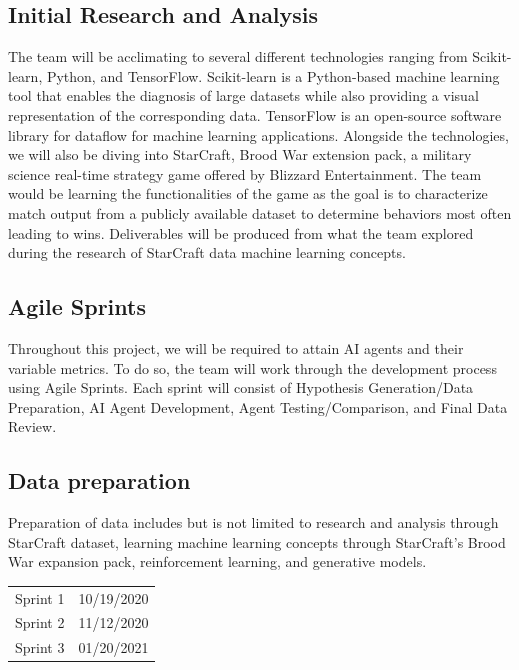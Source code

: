 \documentclass[a4paper,12pt]{report}
\begin{document}
\subsection{Initial Research and Analysis}

The team will be acclimating to several different technologies ranging from Scikit-learn, Python, and TensorFlow. Scikit-learn is a Python-based machine learning tool that enables the diagnosis of large datasets while also providing a visual representation of the corresponding data. TensorFlow is an open-source software library for dataflow for machine learning applications. Alongside the technologies, we will also be diving into StarCraft, Brood War extension pack, a military science real-time strategy game offered by Blizzard Entertainment. The team would be learning the functionalities of the game as the goal is to characterize match output from a publicly available dataset to determine behaviors most often leading to wins. Deliverables will be produced from what the team explored during the research of StarCraft data machine learning concepts.

\subsection{Agile Sprints}

Throughout this project, we will be required to attain AI agents and their variable metrics. To do so, the team will work through the development process using Agile Sprints. Each sprint will consist of Hypothesis Generation/Data Preparation, AI Agent Development, Agent Testing/Comparison, and Final Data Review.

\subsection{Data preparation}

Preparation of data includes but is not limited to research and analysis through StarCraft dataset, learning machine learning concepts through StarCraft’s Brood War expansion pack, reinforcement learning, and generative models.

\begin{center}\begin{tabular}{ll}
Sprint 1 & 10/19/2020 \\
Sprint 2 & 11/12/2020 \\
Sprint 3 & 01/20/2021
\end{tabular}\end{center}
\end{document}
